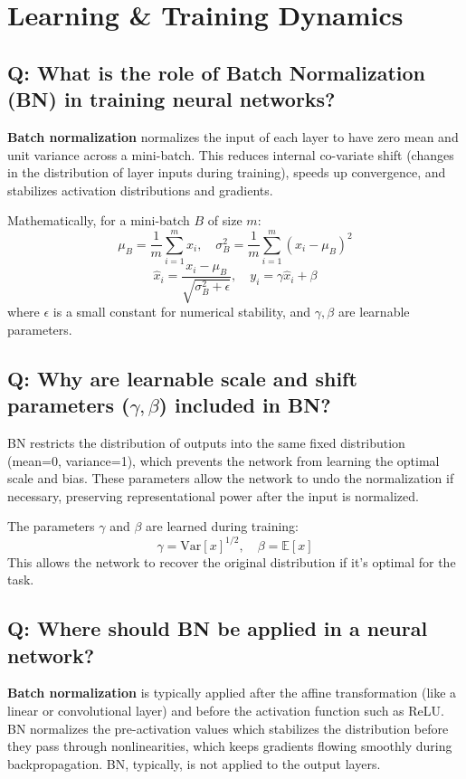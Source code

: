\section{Learning \& Training Dynamics}

\subsection*{Q: What is the role of Batch Normalization (BN) in training neural networks?}
\textbf{Batch normalization} normalizes the input of each layer to have zero mean and unit variance across a mini-batch. This reduces internal co-variate shift (changes in the distribution of layer inputs during training), speeds up convergence, and stabilizes activation distributions and gradients.

Mathematically, for a mini-batch \(B\) of size \(m\):
\[
\mu_B = \frac{1}{m} \sum_{i=1}^{m} x_i, \quad \sigma_B^2 = \frac{1}{m} \sum_{i=1}^{m} (x_i - \mu_B)^2
\]
\[
\hat{x}_i = \frac{x_i - \mu_B}{\sqrt{\sigma_B^2 + \epsilon}}, \quad y_i = \gamma \hat{x}_i + \beta
\]
where \(\epsilon\) is a small constant for numerical stability, and \(\gamma, \beta\) are learnable parameters.

\subsection*{Q: Why are learnable scale and shift parameters (\(\gamma, \beta\)) included in BN?}
BN restricts the distribution of outputs into the same fixed distribution (mean=0, variance=1), which prevents the network from learning the optimal scale and bias. These parameters allow the network to undo the normalization if necessary, preserving representational power after the input is normalized.

The parameters \(\gamma\) and \(\beta\) are learned during training:
\[
\gamma = \text{Var}[x]^{1/2}, \quad \beta = \mathbb{E}[x]
\]
This allows the network to recover the original distribution if it's optimal for the task.

\subsection*{Q: Where should BN be applied in a neural network?}
\textbf{Batch normalization} is typically applied after the affine transformation (like a linear or convolutional layer) and before the activation function such as ReLU. BN normalizes the pre-activation values which stabilizes the distribution before they pass through nonlinearities, which keeps gradients flowing smoothly during backpropagation. BN, typically, is not applied to the output layers.


